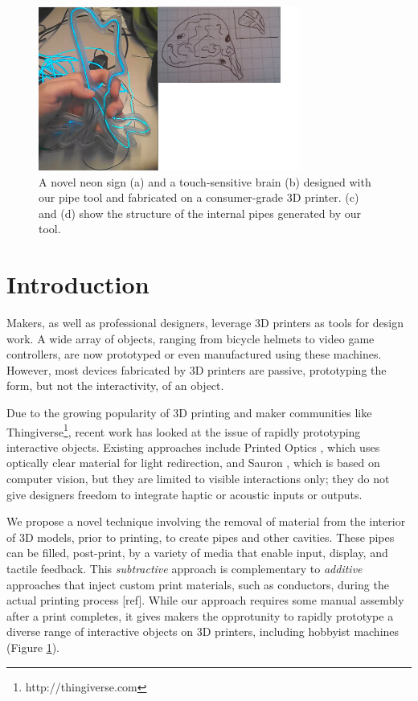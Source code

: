 \begin{figure}[h]
\centering
    \includegraphics[width=3.4in]{figures/placeholder/teaser.png}
\caption{A novel neon sign (a) and a touch-sensitive brain (b) designed with our pipe tool and fabricated on a consumer-grade 3D printer.  (c) and (d) show the structure of the internal pipes generated by our tool.   }
\label{fig:teaser}
\end{figure}

\section{Introduction}
Makers, as well as professional designers, leverage 3D printers as tools for design work.  A wide array of objects, ranging from bicycle helmets to video game controllers, are now prototyped or even manufactured using these machines.  However, most devices fabricated by 3D printers are passive, prototyping the form, but not the interactivity, of an object.  

Due to the growing popularity of 3D printing and maker communities like Thingiverse\footnote{http://thingiverse.com}, recent work has looked at the issue of rapidly prototyping interactive objects. Existing approaches include Printed Optics \cite{Willis-printedoptics}, which uses optically clear material for light redirection, and Sauron \cite{Savage-sauron}, which is based on computer vision, but they are limited to visible interactions only; they do not give designers freedom to integrate haptic or acoustic inputs or outputs.

We propose a novel technique involving the removal of material from the interior of 3D models, prior to printing, to create pipes and other cavities.  These pipes can be filled, post-print, by a variety of media that enable input, display, and tactile feedback.  This {\em subtractive} approach is complementary to {\em additive} approaches that inject custom print materials, such as conductors, during the actual printing process [ref]. While our approach requires some manual assembly after a print completes, it gives makers the opprotunity to rapidly prototype a diverse range of interactive objects on 3D printers, including hobbyist machines (Figure \ref{fig:teaser}).

